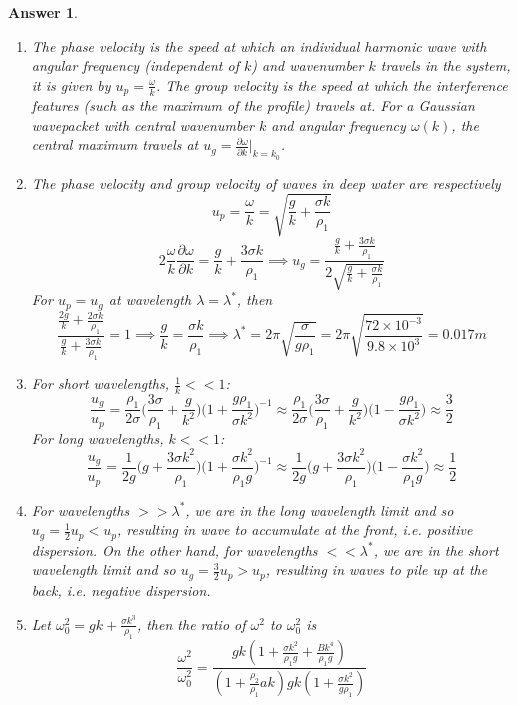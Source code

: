 \documentclass[a4paper]{article}
\newtheorem{ans}{Answer}[subsection]
\theoremstyle{new}
\begin{document}
\begin{ans}\leavevmode
\begin{enumerate}[label=(\roman*)]
\item The phase velocity is the speed at which an individual harmonic wave with angular frequency (independent of $k$) and wavenumber $k$ travels in the system, it is given by $u_p=\frac{\omega}{k}$. The group velocity is the speed at which the interference features (such as the maximum of the profile) travels at. For a Gaussian wavepacket with central wavenumber $k$ and angular frequency $\omega(k)$, the central maximum travels at $u_g=\frac{\partial\omega}{\partial k}|_{k=k_0}$.
\item The phase velocity and group velocity of waves in deep water are respectively
$$u_p=\frac{\omega}{k}=\sqrt{\frac{g}{k}+\frac{\sigma k}{\rho_1}}$$
$$2\frac{\omega}{k}\frac{\partial\omega}{\partial k}=\frac{g}{k}+\frac{3\sigma k}{\rho_1}\implies u_g=\frac{\frac{g}{k}+\frac{3\sigma k}{\rho_1}}{2\sqrt{\frac{g}{k}+\frac{\sigma k}{\rho_1}}}$$
For $u_p=u_g$ at wavelength $\lambda=\lambda^*$, then
$$\frac{\frac{2g}{k}+\frac{2\sigma k}{\rho_1}}{\frac{g}{k}+\frac{3\sigma k}{\rho_1}}=1\implies\frac{g}{k}=\frac{\sigma k}{\rho_1}\implies\lambda^*=2\pi\sqrt{\frac{\sigma}{g\rho_1}}=2\pi\sqrt{\frac{72\times10^{-3}}{9.8\times10^3}}=0.017m$$
\item For short wavelengths, $\frac{1}{k}<<1$:
$$\frac{u_g}{u_p}=\frac{\rho_1}{2\sigma}\bigg(\frac{3\sigma}{\rho_1}+\frac{g}{k^2}\bigg)\bigg(1+\frac{g\rho_1}{\sigma k^2}\bigg)^{-1}\approx\frac{\rho_1}{2\sigma}\bigg(\frac{3\sigma}{\rho_1}+\frac{g}{k^2}\bigg)\bigg(1-\frac{g\rho_1}{\sigma k^2}\bigg)\approx\frac{3}{2}$$
For long wavelengths, $k<<1$:
$$\frac{u_g}{u_p}=\frac{1}{2g}\bigg(g+\frac{3\sigma k^2}{\rho_1}\bigg)\bigg(1+\frac{\sigma k^2}{\rho_1g}\bigg)^{-1}\approx\frac{1}{2g}\bigg(g+\frac{3\sigma k^2}{\rho_1}\bigg)\bigg(1-\frac{\sigma k^2}{\rho_1g}\bigg)\approx\frac{1}{2}$$
\item For wavelengths $>>\lambda^*$, we are in the long wavelength limit and so $u_g=\frac{1}{2}u_p<u_p$, resulting in wave to accumulate at the front, i.e. positive dispersion. On the other hand, for wavelengths $<<\lambda^*$, we are in the short wavelength limit and so $u_g=\frac{3}{2}u_p>u_p$, resulting in waves to pile up at the back, i.e. negative dispersion.
\item Let $\omega_0^2=gk+\frac{\sigma k^3}{\rho_1}$, then the ratio of $\omega^2$ to $\omega_0^2$ is
$$\frac{\omega^2}{\omega_0^2}=\frac{gk(1+\frac{\sigma k^2}{\rho_1g}+\frac{Bk^4}{\rho_1g})}{(1+\frac{\rho_2}{\rho_1}ak)gk(1+\frac{\sigma k^2}{g\rho_1})}$$

\end{enumerate}
\end{ans}
\end{document}
